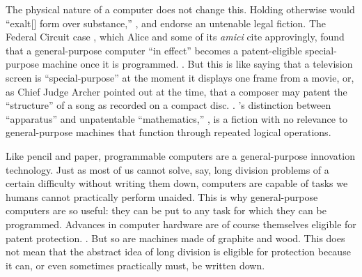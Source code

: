 \documentclass{scotus}
\begin{document}
The physical nature of a computer does not change this.  Holding otherwise would
``exalt[] form over substance,'' , and endorse an
untenable legal fiction.  The Federal Circuit case , which Alice
and some of its \emph{amici} cite approvingly, \iffalse COMMENTED AS UNNECESSARY
EXPLANATION --ANNA illustrates why this Court has previously rejected such “rigid
line-drawing.” \sentence{alappat; bilski at 99999}.  \inline{alappat} drew a
formalistic distinction between general-purpose and special-purpose computers
wherein ideas implemented on the second were patentable, then relied on the
fiction that a \fi found that a general-purpose computer ``in effect'' becomes a
patent-eligible special-purpose machine once it is programmed.  . But this is like saying that a television screen is
``special-purpose'' at the moment it displays one frame from a movie, or, as Chief
Judge Archer pointed out at the time, that a composer may patent the ``structure''
of a song as recorded on a compact disc.  . 's distinction between ``apparatus''
and unpatentable ``mathematics,'' , is a fiction with no
relevance to general-purpose machines that function through repeated logical
operations. \iffalse COMMENTED BECAUSE I COULDN'T FIND THIS AND IT'S NOT NECESSARY
--ANNA and moreover this Court in \inline{bilski} rejected the idea that use of
computer technology is categorically sufficient to confer patent protection.
\sentence{see bilski at 3227}. \fi

Like pencil and paper, programmable computers are a general-purpose innovation
technology.  Just as most of us cannot solve, say, long division problems of a
certain difficulty without writing them down, computers are capable of tasks we
humans cannot practically perform unaided.  This is why general-purpose computers
are so useful:  they can be put to any task for which they can be programmed.
Advances in computer hardware are of course themselves eligible for patent
protection.  .  But so are machines made of graphite and wood.  This does not mean
that the abstract idea of long division is eligible for protection because it can,
or even sometimes practically must, be written down.
\end{document}
